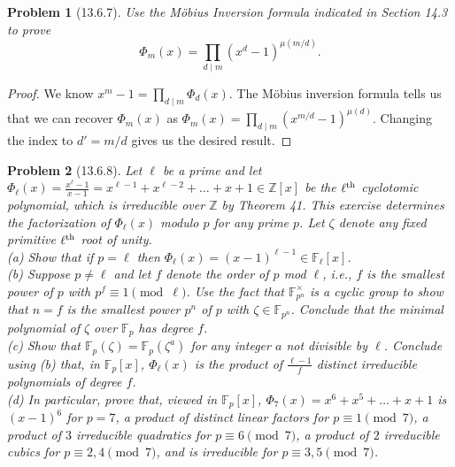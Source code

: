 \documentclass{article}
\newtheorem{problem}{Problem}
\begin{document}
\begin{problem}[13.6.7]
Use the M\"{o}bius Inversion formula indicated in Section 14.3 to prove
\[
\Phi_m(x) = \prod_{d \mid m} (x^d - 1)^{\mu(m/d)}.
\]
\end{problem}
\begin{proof}
We know $x^m - 1 = \prod_{d \mid m} \Phi_d(x)$. The M\"{o}bius inversion formula tells us that we can recover $\Phi_m(x)$ as $\Phi_m(x) = \prod_{d \mid m} (x^{m/d} - 1)^{\mu(d)}$. Changing the index to $d' = m/d$ gives us the desired result.
\end{proof}

\begin{problem}[13.6.8]
Let $\ell$ be a prime and let $\Phi_{\ell}(x) = \frac{x^{\ell}-1}{x-1} = x^{\ell-1} + x^{\ell-2} + \dots + x + 1 \in \mathbb{Z}[x]$ be the $\ell^{\textup{th}}$ cyclotomic polynomial, which is irreducible over $\mathbb{Z}$ by Theorem 41. This exercise determines the factorization of $\Phi_{\ell}(x)$ modulo $p$ for any prime $p$. Let $\zeta$ denote any fixed primitive $\ell^{\textup{th}}$ root of unity.\\
(a) Show that if $p = \ell$ then $\Phi_{\ell}(x) = (x-1)^{\ell-1} \in \mathbb{F}_{\ell}[x]$.\\
(b) Suppose $p \neq \ell$ and let $f$ denote the order of $p$ mod $\ell$, i.e., $f$ is the smallest power of $p$ with $p^f \equiv 1 \pmod{\ell}$. Use the fact that $\mathbb{F}_{p^n}^{\times}$ is a cyclic group to show that $n = f$ is the smallest power $p^n$ of $p$ with $\zeta \in \mathbb{F}_{p^n}$. Conclude that the minimal polynomial of $\zeta$ over $\mathbb{F}_p$ has degree $f$.\\
(c) Show that $\mathbb{F}_p(\zeta) = \mathbb{F}_p(\zeta^a)$ for any integer $a$ not divisible by $\ell$. Conclude using (b) that, in $\mathbb{F}_p[x]$, $\Phi_{\ell}(x)$ is the product of $\frac{\ell-1}{f}$ distinct irreducible polynomials of degree $f$.\\
(d) In particular, prove that, viewed in $\mathbb{F}_p[x]$, $\Phi_7(x) = x^6 + x^5 + \dots + x + 1$ is $(x-1)^6$ for $p = 7$, a product of distinct linear factors for $p \equiv 1 \pmod{7}$, a product of $3$ irreducible quadratics for $p \equiv 6 \pmod{7}$, a product of $2$ irreducible cubics for $p \equiv 2,4 \pmod{7}$, and is irreducible for $p \equiv 3,5 \pmod{7}$.
\end{problem}
\end{document}
